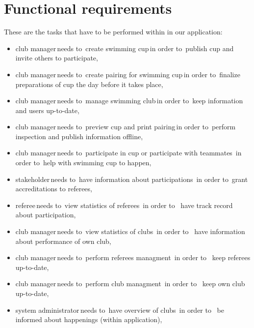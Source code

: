 \section{Functional requirements}
These are the tasks that have to be performed within in our application:
\begin{itemize}
    \item \lbrack club manager\rbrack \,needs to\, \lbrack create swimming cup\rbrack \,in order to\, \lbrack publish cup and invite others to participate\rbrack,
    \item \lbrack club manager\rbrack \,needs to\, \lbrack create pairing for swimming cup\rbrack \,in order to\, \lbrack finalize preparations of cup the day before it takes place\rbrack,
    \item \lbrack club manager\rbrack \,needs to\, \lbrack manage swimming club\rbrack \,in order to\, \lbrack keep information and users up-to-date\rbrack,
    \item \lbrack club manager\rbrack \,needs to\, \lbrack preview cup and print pairing\rbrack \,in order to\, \lbrack perform inspection and publish information offline\rbrack,
    \item \lbrack club manager\rbrack \,needs to\, \lbrack participate in cup or participate with teammates\rbrack \, in order to\, \lbrack help with swimming cup to happen\rbrack,
    \item \lbrack stakeholder\rbrack \,needs to\, \lbrack have information about participations\rbrack \, in order to\, \lbrack grant accreditations to referees\rbrack,
    \item \lbrack referee\rbrack \,needs to\, \lbrack view statistics of referees\rbrack \, in order to \, \lbrack have track record about participation\rbrack,
    \item \lbrack club manager\rbrack \,needs to\, \lbrack view statistics of clubs\rbrack \, in order to \, \lbrack have information about performance of own club\rbrack,
    \item \lbrack club manager\rbrack \,needs to\, \lbrack perform referees managment\rbrack \, in order to \, \lbrack keep referees up-to-date\rbrack,
    \item \lbrack club manager\rbrack \,needs to\, \lbrack perform club managment\rbrack \, in order to \, \lbrack keep own club up-to-date\rbrack,
    \item \lbrack system administrator\rbrack \,needs to\, \lbrack have overview of clubs\rbrack \, in order to \, \lbrack be informed about happenings (within application)\rbrack,

\end{itemize}
